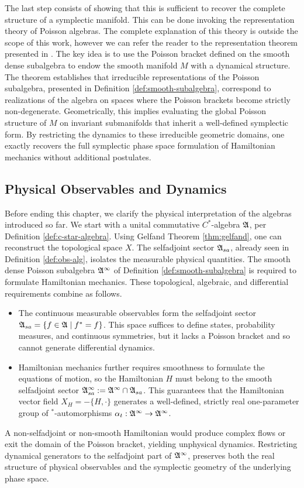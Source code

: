 	The last step consists of showing that this is sufficient to recover the complete structure of a  symplectic manifold. This can be done invoking the representation theory of Poisson algebras. The complete explanation of this theory is outside the scope of this work, however we can refer the reader to the representation theorem presented in \cite[Theorem 2.6.7]{landsmanMathematicalTopicsClassical1998}. The key idea is to use the Poisson bracket defined on the smooth dense subalgebra to endow the smooth manifold $M$ with a dynamical structure. The theorem establishes that irreducible representations of the Poisson subalgebra, presented in Definition \ref{def:smooth-subalgebra}, correspond to realizations of the algebra on spaces where the Poisson brackets become strictly non-degenerate. Geometrically, this implies evaluating the global Poisson structure of $M$ on invariant submanifolds that inherit a well-defined symplectic form. By restricting the dynamics to these irreducible geometric domains, one exactly recovers the full symplectic phase space formulation of Hamiltonian mechanics without additional postulates.
	
	\subsection*{Physical Observables and Dynamics}\label{sec:interpret-phys}
	Before ending this chapter, we clarify the physical interpretation of the algebras introduced so far. We start with a unital commutative $C^*$-algebra $\mathfrak{A}$, per Definition \ref{def:c-star-algebra}. Using Gelfand Theorem \ref{thm:gelfand}, one can reconstruct the topological space $X$. The selfadjoint sector $\mathfrak{A}_{sa}$, already seen in Definition \ref{def:obs-alg}, isolates the measurable physical quantities. The smooth dense Poisson subalgebra $\mathfrak{A}^\infty$ of Definition \ref{def:smooth-subalgebra} is required to formulate Hamiltonian mechanics. These topological, algebraic, and differential requirements combine as follows.
	\begin{itemize}
		\item The continuous measurable observables form the selfadjoint sector $\mathfrak{A}_{sa} = \{f \in \mathfrak{A} \mid f^* = f\}$. This space suffices to define states, probability measures, and continuous symmetries, but it lacks a Poisson bracket and so cannot generate differential dynamics.
		\item Hamiltonian mechanics further requires smoothness to formulate the equations of motion, so the Hamiltonian $H$ must belong to the smooth selfadjoint sector $\mathfrak{A}^\infty_{sa} := \mathfrak{A}^\infty \cap \mathfrak{A}_{sa}$. This guarantees that the Hamiltonian vector field $X_H = -\{H, \cdot\}$ generates a well-defined, strictly real one-parameter group of $^*$-automorphisms $\alpha_t : \mathfrak{A}^\infty \to \mathfrak{A}^\infty$.
	\end{itemize}
	A non-selfadjoint or non-smooth Hamiltonian would produce complex flows or exit the domain of the Poisson bracket, yielding unphysical dynamics. Restricting dynamical generators to the selfadjoint part of $\mathfrak{A}^\infty$, preserves both the real structure of physical observables and the symplectic geometry of the underlying phase space.

